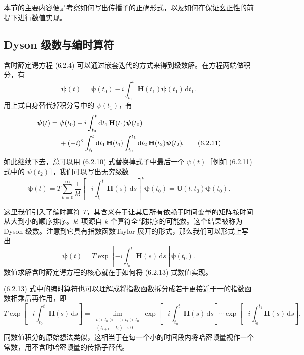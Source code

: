 本节的主要内容便是考察如何写出传播子的正确形式，以及如何在保证幺正性的前提下进行数值实现。

\subsection{Dyson 级数与编时算符}

含时薛定谔方程 (6.2.4) 可以通过嵌套迭代的方式来得到级数解。在方程两端做积分，有
\begin{equation}
 \bm\psi(t)=\bm\psi(t_0)-i\int_{t_0}^t\mathbf H(t_1)\bm\psi(t_1)\,\mathrm dt_1.
\tag{6.2.10}
\end{equation}
用上式自身替代掉积分号中的 $\psi(t_1)$，有
\begin{align}
 \bm\psi(t)={}&\bm\psi(t_0)-i\int_{t_0}^t\mathrm dt_1\,\mathbf H(t_1)\bm\psi(t_0)\notag\\
 &+(-i)^2\int_{t_0}^t\mathrm dt_1\,\mathbf H(t_1)\int_{t_0}^{t_1}\mathrm dt_2\,\mathbf H(t_2)\bm\psi(t_2).
\tag{6.2.11}
\end{align}
如此继续下去，总可以用 (6.2.10) 式替换掉式子中最后一个 $\psi(t)$［例如 (6.2.11) 式中的 $\psi(t_2)$］，我们可以写出无穷级数
\begin{equation}
 \bm\psi(t)=T\sum_{k=0}^{\infty}\frac1{k!}\left[-i\int_{t_0}^t\mathbf H(s)\,\mathrm ds\right]^k\bm\psi(t_0)=\mathbf U(t,t_0)\bm\psi(t_0).
\tag{6.2.12}
\end{equation}

这里我们引入了编时算符 $T$，其含义在于让其后所有依赖于时间变量的矩阵按时间从大到小的顺序排序。$k!$ 项源自 $k$ 个算符全部排序的可能数。这个结果被称为 Dyson 级数。注意到它具有指数函数Taylor 展开的形式，那么我们可以形式上写出
\begin{equation}
 \bm\psi(t)=T\exp\left[-i\int_{t_0}^t\mathbf H(s)\,\mathrm ds\right]\bm\psi(t_0).
\tag{6.2.13}
\end{equation}
数值求解含时薛定谔方程的核心就在于如何将 (6.2.13) 式数值实现。

(6.2.13) 式中的编时算符也可以理解成将指数函数拆分成若干更接近于一的指数函数相乘后再作用，即
\begin{equation}
 T\exp\left[-i\int_{t_0}^t\mathbf H(s)\,\mathrm ds\right]
 =\lim_{\substack{t>t_n>\cdots>t_1>t_0\\(t_{i+1}-t_i)\to0}}
 \exp\left[-i\int_{t_n}^{t}\mathbf H(s)\,\mathrm ds\right]\cdots
 \exp\left[-i\int_{t_0}^{t_1}\mathbf H(s)\,\mathrm ds\right].
\tag{6.2.14}
\end{equation}
同数值积分的原始想法类似，这相当于在每一个小的时间段内将哈密顿量视作一个常数，用不含时哈密顿量的传播子替代。

